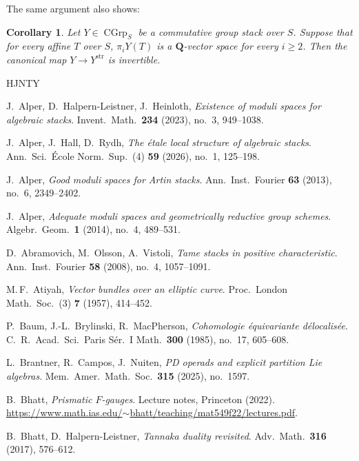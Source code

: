 \documentclass[12pt, oneside]{amsart}
\numberwithin{equation}{section}
\newtheorem{corollary}[subsubsection]{Corollary}
\theoremstyle{remark}
\theoremstyle{plain}
\renewcommand{\geq}{\geqslant}
\newcommand{\bQ}{\mathbf{Q}}
\newcommand{\CGrp}{\operatorname{CGrp}}
\begin{document}
The same argument also shows:

\begin{corollary}\label{cor:strictification strict source}
Let $Y \in \CGrp_S$ be a commutative group stack over $S$.
Suppose that for every affine $T$ over $S$, $\pi_i Y(T)$ is a $\bQ$-vector space for every $i\geq2$.
Then the canonical map $Y\to Y^{\mathrm{str}}$ is invertible.
\end{corollary}

\begin{thebibliography}{HJNTY}

   J.~Alper, D.~Halpern-Leistner, J.~Heinloth, \textit{Existence of moduli spaces for algebraic stacks}. Invent.\ Math.\ {\bf{234}} (2023), no.~3, 949--1038.

   J.~Alper, J.~Hall, D.~Rydh, \textit{The \'etale local structure of algebraic stacks}. Ann.\ Sci.\ \'Ecole Norm.\ Sup.\ (4) {\bf{59}} (2026), no.~1, 125--198.

   J.~Alper, \textit{Good moduli spaces for Artin stacks}. Ann.\ Inst.\ Fourier {\bf{63}} (2013), no.~6, 2349--2402.

   J.~Alper, \textit{Adequate moduli spaces and geometrically reductive group schemes}. Algebr.\ Geom.\ {\bf{1}} (2014), no.~4, 489--531.

   D.~Abramovich, M.~Olsson, A.~Vistoli, \textit{Tame stacks in positive characteristic}. Ann.\ Inst.\ Fourier {\bf{58}} (2008), no.~4, 1057--1091.

   M.\,F.~Atiyah, \textit{Vector bundles over an elliptic curve}. Proc.\ London Math.\ Soc.\ (3) {\bf{7}} (1957), 414--452.

   P.~Baum, J.-L.~Brylinski, R.~MacPherson, \textit{Cohomologie \'equivariante d\'elocalis\'ee}. C.\ R.\ Acad.\ Sci.\ Paris S\'er.\ I Math.\ {\bf{300}} (1985), no.~17, 605--608.

   L.~Brantner, R.~Campos, J.~Nuiten, \textit{PD operads and explicit partition Lie algebras}. Mem.\ Amer.\ Math.\ Soc.\ {\bf{315}} (2025), no.~1597.

   B.~Bhatt, \textit{Prismatic $F$-gauges}. Lecture notes, Princeton (2022). \href{https://www.math.ias.edu/~bhatt/teaching/mat549f22/lectures.pdf}{https://www.math.ias.edu/$\sim$bhatt/teaching/mat549f22/lectures.pdf}.

   B.~Bhatt, D.~Halpern-Leistner, \textit{Tannaka duality revisited}. Adv.\ Math.\ {\bf{316}} (2017), 576--612.


\end{thebibliography}
\end{document}
